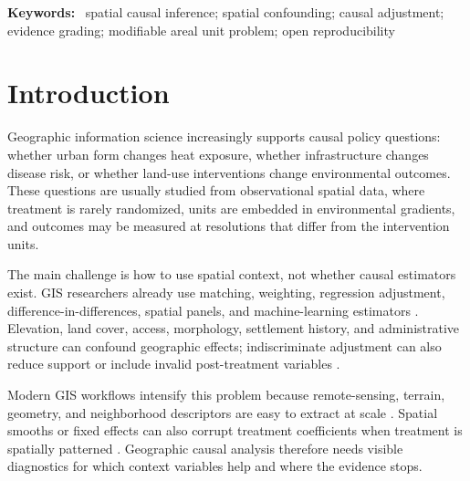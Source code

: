 \documentclass{article}
\newenvironment{keywords}{\par\noindent\textbf{Keywords:}\ }{\par}
\begin{document}
\begin{abstract}
SCCA contributes a reproducible protocol for auditing evidence in geographic causal analysis. It does not remove unmeasured spatial confounding, solve interference, or make restricted data fully reproducible; it makes adjustment choices, spatial diagnostics, and claim boundaries inspectable across GIS-facing workflows.
\end{abstract}

\begin{keywords}
spatial causal inference; spatial confounding; causal adjustment; evidence grading; modifiable areal unit problem; open reproducibility
\end{keywords}


\section{Introduction}
\label{sec:intro}

Geographic information science increasingly supports causal policy questions: whether urban form changes heat exposure, whether infrastructure changes disease risk, or whether land-use interventions change environmental outcomes. These questions are usually studied from observational spatial data, where treatment is rarely randomized, units are embedded in environmental gradients, and outcomes may be measured at resolutions that differ from the intervention units.

The main challenge is how to use spatial context, not whether causal estimators exist. GIS researchers already use matching, weighting, regression adjustment, difference-in-differences, spatial panels, and machine-learning estimators \citep{stuart2010matching, angrist2009mostly, athey2019estimating, hernan2020whatif}. Elevation, land cover, access, morphology, settlement history, and administrative structure can confound geographic effects; indiscriminate adjustment can also reduce support or include invalid post-treatment variables \citep{reich2021review,gilbert2021spatialconfounding,hodges2010adding,paciorek2010importance,dupont2022spatial+,khan2022restricted}.

Modern GIS workflows intensify this problem because remote-sensing, terrain, geometry, and neighborhood descriptors are easy to extract at scale \citep{anselin2014modern,brunsdon2016quantitative}. Spatial smooths or fixed effects can also corrupt treatment coefficients when treatment is spatially patterned \citep{hodges2010adding,dupont2022spatial+,tec2023spatialdml}. Geographic causal analysis therefore needs visible diagnostics for which context variables help and where the evidence stops.
\end{document}
